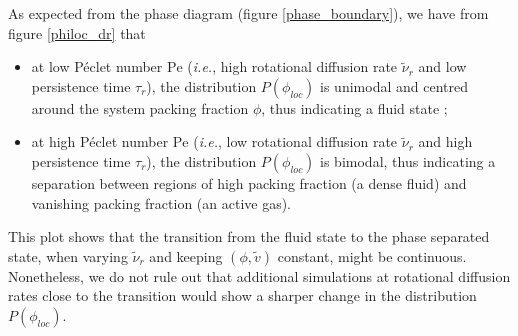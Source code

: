 \documentclass[class=report, float=false, crop=false]{standalone}
\begin{document}
As expected from the phase diagram (figure \ref{phase_boundary}), we have from figure \ref{philoc_dr} that
\begin{itemize}
  \item at low P\'eclet number $\text{Pe}$ (\textit{i.e.}, high rotational diffusion rate $\tilde{\nu}_r$ and low persistence time $\tau_r$), the distribution $P(\phi_{loc})$ is unimodal and centred around the system packing fraction $\phi$, thus indicating a fluid state ;
  \item at high P\'eclet number $\text{Pe}$ (\textit{i.e.}, low rotational diffusion rate $\tilde{\nu}_r$ and high persistence time $\tau_r$), the distribution $P(\phi_{loc})$ is bimodal, thus indicating a separation between regions of high packing fraction (a dense fluid) and vanishing packing fraction (an active gas).
\end{itemize}
This plot shows that the transition from the fluid state to the phase separated state, when varying $\tilde{\nu}_r$ and keeping $(\phi, \tilde{v})$ constant, might be continuous. Nonetheless, we do not rule out that additional simulations at rotational diffusion rates close to the transition would show a sharper change in the distribution $P(\phi_{loc})$.
\end{document}
